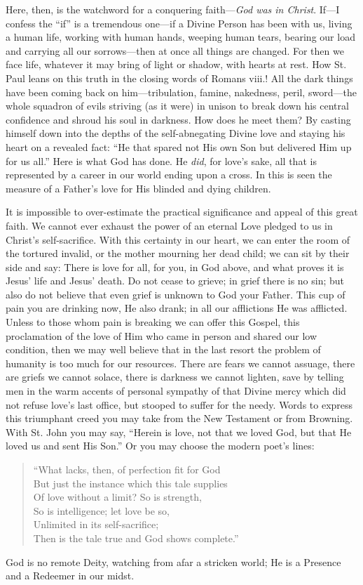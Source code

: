 \documentclass[12pt,a5paper,oneside]{book}
\begin{document}
Here, then, is the watchword for a conquering 
faith---\textit{God was in Christ}. If---I confess
the ``if'' is a tremendous one---if a Divine
Person has been with us, living a human life,
working with human hands, weeping human
tears, bearing our load and carrying all our
sorrows---then at once all things are changed.
For then we face life, whatever it may
bring of light or shadow, with hearts at rest.
How St. Paul leans on this truth in the closing
words of Romans viii.! All the dark things have
been coming back on him---tribulation, famine,
nakedness, peril, sword---the whole squadron of
evils striving (as it were) in unison to break
down his central confidence and shroud his
soul in darkness. How does he meet them?
By casting himself down into the depths of
the self-abnegating Divine love and staying his
heart on a revealed fact: ``He that spared not
His own Son but delivered Him up for us all.''
Here is what God has done. He \textit{did}, for love's
sake, all that is represented by a career in our
world ending upon a cross. In this is seen
the measure of a Father's love for His blinded
and dying children.

It is impossible to over-estimate the practical
significance and appeal of this great faith.
We cannot ever exhaust the power of an eternal
Love pledged to us in Christ's self-sacrifice.
With this certainty in our heart, we can enter
the room of the tortured invalid, or the mother
mourning her dead child; we can sit by their
side and say: There is love for all, for you, in
God above, and what proves it is Jesus' life and
Jesus' death. Do not cease to grieve; in grief
there is no sin; but also do not believe that
even grief is unknown to God your Father.
This cup of pain you are drinking now, He also
drank; in all our afflictions He was afflicted.
Unless to those whom pain is breaking we can
offer this Gospel, this proclamation of the love
of Him who came in person and shared our low
condition, then we may well believe that in the
last resort the problem of humanity is too much
for our resources. There are fears we cannot
assuage, there are griefs we cannot solace, there is
darkness we cannot lighten, save by telling men in
the warm accents of personal sympathy of that
Divine mercy which did not refuse love's last
office, but stooped to suffer for the needy.
Words to express this triumphant creed you
may take from the New Testament or from
Browning. With St. John you may say, ``Herein
is love, not that we loved God, but that He
loved us and sent His Son.'' Or you may choose
the modern poet's lines:
\begin{verse}
\small
``What lacks, then, of perfection fit for God\\
But just the instance which this tale supplies\\ 
Of love without a limit? So is strength,\\
So is intelligence; let love be so,\\
Unlimited in its self-sacrifice;\\
Then is the tale true and God shows complete.''
\end{verse}
God is no remote Deity, watching from afar a
stricken world; He is a Presence and a Redeemer
in our midst.
\end{document}
